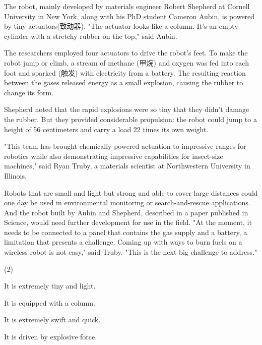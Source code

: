 \documentclass{英语试卷}
\begin{document}
\par The robot, mainly developed by materials engineer Robert Shepherd at Cornell University in New York, along with his PhD student Cameron Aubin, is powered by tiny actuators(致动器). "The actuator looks like a column. It’s an empty cylinder with a stretchy rubber on the top," said Aubin.\par
\par The researchers employed four actuators to drive the robot's feet. To make the robot jump or climb, a stream of methane (甲烷) and oxygen was fed into each foot and sparked (触发) with electricity from a battery. The resulting reaction between the gases released energy as a small explosion, causing the rubber to change its form.\par
\par Shepherd noted that the rapid explosions were so tiny that they didn't damage the rubber. But they provided considerable propulsion: the robot could jump to a height of 56 centimeters and carry a load 22 times its own weight.\par
\par "This team has brought chemically powered actuation to impressive ranges for robotics while also demonstrating impressive capabilities for insect-size machines," said Ryan Truby, a materials scientist at Northwestern University in Illinois.\par
\par Robots that are small and light but strong and able to cover large distances could one day be used in environmental monitoring or search-and-rescue applications. And the robot built by Aubin and Shepherd, described in a paper published in Science, would need further development for use in the field. "At the moment, it needs to be connected to a panel that contains the gas supply and a battery, a limitation that presents a challenge. Coming up with ways to burn fuels on a wireless robot is not easy," said Truby. "This is the next big challenge to address."\par
{}
\begin{choices}(2)
  \item It is extremely tiny and light.
  \item It is equipped with a column.
  \item It is extremely swift and quick.
  \item It is driven by explosive force.
\end{choices}
\end{document}
